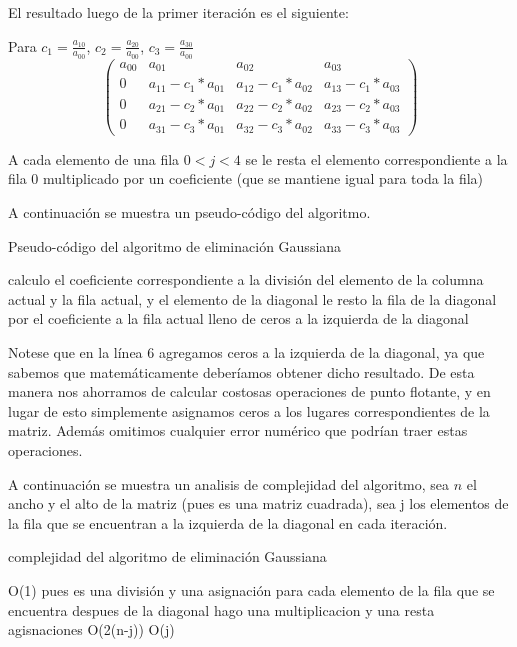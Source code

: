 \documentclass{article}
\begin{document}
El resultado luego de la primer iteración es el siguiente:

Para $c_1=\frac{a_{10}}{a_{00}}$, $c_2=\frac{a_{20}}{a_{00}}$, $c_3=\frac{a_{30}}{a_{00}}$ 
\[ \left( \begin{array}{cccc}
a_{00} & a_{01} & a_{02} & a_{03}\\
0 & a_{11}-c_1*a_{01} & a_{12}-c_1*a_{02} & a_{13}-c_1*a_{03} \\
0 & a_{21}-c_2*a_{01} & a_{22}-c_2*a_{02} & a_{23}-c_2*a_{03}\\
0 & a_{31}-c_3*a_{01} & a_{32}-c_3*a_{02} & a_{33}-c_3*a_{03}\end{array} \right)\] 

A cada elemento de una fila $0<j<4$ se le resta el elemento correspondiente a la fila 0 multiplicado por un coeficiente (que se mantiene igual para toda la fila)


A continuación se muestra un pseudo-código del algoritmo.

\begin{algorithm}[H]
\caption{Pseudo-código del algoritmo de eliminación Gaussiana}
\begin{algorithmic}[1]
		\State calculo el coeficiente correspondiente a la división del elemento de la columna actual y la fila actual, y el elemento de la diagonal
		\State le resto la fila de la diagonal por el coeficiente a la fila actual
	\EndFor
	\State lleno de ceros a la izquierda de la diagonal
\EndFor
\end{algorithmic}
\end{algorithm}

Notese que en la línea 6 agregamos ceros a la izquierda de la diagonal, ya que sabemos que matemáticamente deberíamos obtener dicho resultado. De esta manera nos ahorramos de calcular costosas operaciones de punto flotante, y en lugar de esto simplemente asignamos ceros a los lugares correspondientes de la matriz. Además omitimos cualquier error numérico que podrían traer estas operaciones.

A continuación se muestra un analisis de complejidad del algoritmo, sea $n$ el ancho y el alto de la matriz (pues es una matriz cuadrada), sea j los elementos de la fila que se encuentran a la izquierda de la diagonal en cada iteración.

 \begin{algorithm}[H]
\caption{complejidad del algoritmo de eliminación Gaussiana}
\begin{algorithmic}[1]
		\State O(1) pues es una división y una asignación
		\State para cada elemento de la fila que se encuentra despues de la diagonal hago una multiplicacion y una resta agisnaciones O(2(n-j))
	\EndFor
	\State O(j)
\EndFor
\end{algorithmic}
\end{algorithm}
\end{document}
